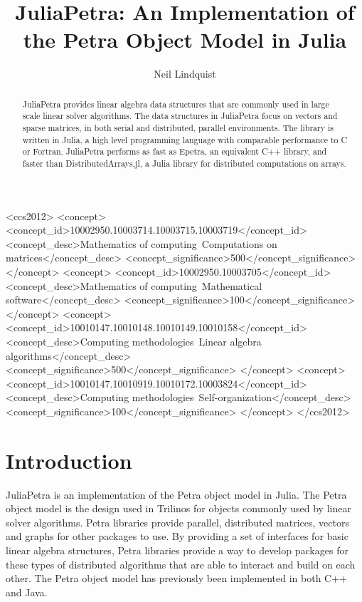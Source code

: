 \documentclass[acmsmall]{acmart}
\title{JuliaPetra: An Implementation of the Petra Object Model in Julia}
\author{Neil Lindquist}
\begin{document}
\begin{CCSXML}
<ccs2012>
	<concept>
		<concept_id>10002950.10003714.10003715.10003719</concept_id>
		<concept_desc>Mathematics of computing~Computations on matrices</concept_desc>
		<concept_significance>500</concept_significance>
	</concept>
	<concept>
		<concept_id>10002950.10003705</concept_id>
		<concept_desc>Mathematics of computing~Mathematical software</concept_desc>
		<concept_significance>100</concept_significance>
	</concept>
	<concept>
		<concept_id>10010147.10010148.10010149.10010158</concept_id>
		<concept_desc>Computing methodologies~Linear algebra algorithms</concept_desc>
		<concept_significance>500</concept_significance>
	</concept>
	<concept>
		<concept_id>10010147.10010919.10010172.10003824</concept_id>
		<concept_desc>Computing methodologies~Self-organization</concept_desc>
		<concept_significance>100</concept_significance>
	</concept>
</ccs2012>
\end{CCSXML}


\begin{abstract}
JuliaPetra provides linear algebra data structures that are commonly used in large scale linear solver algorithms.
The data structures in JuliaPetra focus on vectors and sparse matrices, in both serial and
distributed, parallel environments.
The library is written in Julia, a high level programming language with comparable performance to C or Fortran.
JuliaPetra performs as fast as Epetra, an equivalent C++ library, and faster than DistributedArrays.jl, a Julia
library for distributed computations on arrays.
\end{abstract}

\maketitle

\section{Introduction}

JuliaPetra is an implementation of the Petra object model in Julia.
The Petra object model is the design used in Trilinos for objects commonly used by linear solver algorithms.
\cite{OverviewOfTrilinos}
Petra libraries provide parallel, distributed matrices, vectors and graphs for other packages to use.
By providing a set of interfaces for basic linear algebra structures, Petra libraries provide a way
to develop packages for these types of distributed algorithms that are able to interact and build on each other.
The Petra object model has previously been implemented in both C++ and Java.
\end{document}
